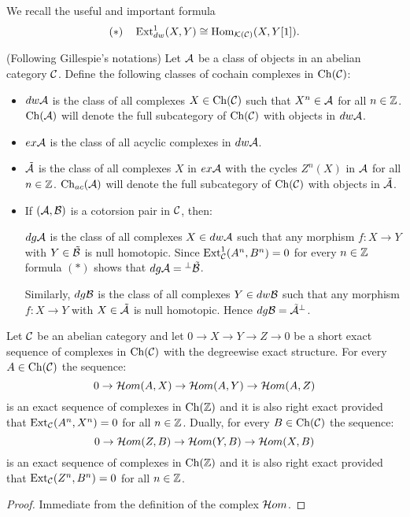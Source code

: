We recall the useful and important formula
\[(\ast)\quad \operatorname{Ext}^1_{dw}(X, Y) \cong \operatorname{Hom}_{\mathcal{K}(\mathcal{C})}(X,Y[1]).\] %
%
%
\begin{nota}\label{N:notation} (Following Gillespie's notations) Let $\mathcal{A}$ be a class of objects in an abelian category $\mathcal{C}$.
 Define the following classes of cochain
  complexes in $\mathrm{Ch}(\mathcal{C})$:

  \begin{itemize}
    \item
      $dw\mathcal{A}$ is the class of all complexes $X\in\mathrm{Ch}(\mathcal{C})$
      such that $X^n\in\mathcal{A}$ for all $n\in\mathbb{Z}$.  $\mathrm{Ch}(\mathcal{A})$ will denote the full subcategory of  $\mathrm{Ch}(\mathcal{C})$ with objects in $dw \mathcal{A}$.
       \item
      $ex\mathcal{A}$ is the class of all acyclic complexes in $dw\mathcal{A}$.
       \item
      $\tilde{\mathcal{A}}$ is the class of all complexes $X$ in $
      ex\mathcal{A}$ with the cycles $Z^n(X)$ in $\mathcal{A}$ for all $n\in \mathbb{Z}$.
   $\mathrm{Ch}_{ac}(\mathcal{A})$ will denote the full subcategory of  $\mathrm{Ch}(\mathcal{C})$ with objects in $\tilde{\mathcal{A}}$.


    \item  If $(\mathcal{A}, \mathcal{B})$ is a cotorsion pair in $\mathcal{C}$, then:

      $dg\mathcal{A}$ is the class of all complexes $X\in dw\mathcal{A}$
      such that  any morphism
      $f:X\to Y$ with $Y\in\tilde {\mathcal{B}}$ is null homotopic. Since $\operatorname{Ext}^1_{\mathcal{C}}(A^n, B^n)=0$ for every $n\in \mathbb{Z}$ formula $(\ast)$ shows that $dg\mathcal{A}={}^\perp{} \tilde {\mathcal{B}}$.

      Similarly, $dg\mathcal{B}$ is the class of all complexes $Y \in dw\mathcal{B}$
      such that  any morphism
      $f:X\to Y$ with $X\in\tilde{\mathcal{A}}$  is null homotopic. Hence $dg\mathcal{B}=\tilde{\mathcal{A}}{}^\perp{}$.
  \end{itemize}
\end{nota}
%
%
%
%
%
\begin{lem}\label{L:HOM}
  \begin{sloppypar}
  Let $\mathcal{C}$ be an abelian category and let ${0\to X\to Y\to Z\to 0}$ be a short exact sequence of complexes in $\mathrm{Ch}(\mathcal{C})$ with the degreewise exact structure. For every $A\in \mathrm{Ch}(\mathcal{C})$ the sequence:
\[0\to \mathcal{H}\mathnormal{om}(A, X)\to  \mathcal{H}\mathnormal{om}(A, Y)\to \mathcal{H}\mathnormal{om}(A, Z)\]
is an exact sequence of complexes in $\mathrm{Ch}(\mathbb{Z})$ and it is also right exact provided that $\operatorname{Ext}_{\mathcal{C}}(A^n, X^n)=0$ for all $n\in \mathbb{Z}$.
 Dually, for every $B\in \mathrm{Ch}(\mathcal{C})$ the sequence:
\[0\to \mathcal{H}\mathnormal{om}(Z, B)\to  \mathcal{H}\mathnormal{om}(Y, B)\to \mathcal{H}\mathnormal{om}(X, B)\]
is an exact sequence of complexes in $\mathrm{Ch}(\mathbb{Z})$ and it is also right exact provided that $\operatorname{Ext}_{\mathcal{C}}(Z^n, B^n)=0$ for all $n\in \mathbb{Z}$.
\end{sloppypar}
\end{lem}
\begin{proof} Immediate from the definition of the complex $\mathcal{H}\mathnormal{om}$.
\end{proof}
%
%
